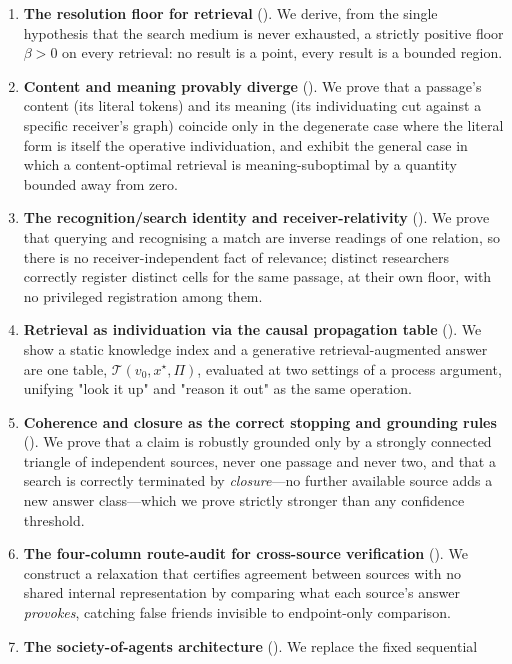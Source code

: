 \documentclass[11pt,twocolumn,a4paper]{article}
\theoremstyle{frathm}
\theoremstyle{definition}
\theoremstyle{remark}
\newcommand{\flo}{\beta}
\newcommand{\Tab}{\mathcal{T}}
\newcommand{\Proc}{\Pi}
\begin{document}
\begin{enumerate}[leftmargin=1.4em,itemsep=2pt]
\item \textbf{The resolution floor for retrieval} (). We
derive, from the single hypothesis that the search medium is never
exhausted, a strictly positive floor $\flo>0$ on every retrieval: no
result is a point, every result is a bounded region.
\item \textbf{Content and meaning provably diverge}
(). We prove that a passage's content (its
literal tokens) and its meaning (its individuating cut against a specific
receiver's graph) coincide only in the degenerate case where the literal
form is itself the operative individuation, and exhibit the general case
in which a content-optimal retrieval is meaning-suboptimal by a
quantity bounded away from zero.
\item \textbf{The recognition/search identity and receiver-relativity}
(). We prove that querying and recognising a
match are inverse readings of one relation, so there is no
receiver-independent fact of relevance; distinct researchers correctly
register distinct cells for the same passage, at their own floor, with
no privileged registration among them.
\item \textbf{Retrieval as individuation via the causal propagation
table} (). We show a static knowledge index and a
generative retrieval-augmented answer are one table,
$\Tab(v_0,x^{\star},\Proc)$, evaluated at two settings of a process
argument, unifying "look it up" and "reason it out" as the same
operation.
\item \textbf{Coherence and closure as the correct stopping and grounding
rules} (). We prove that a claim is robustly grounded
only by a strongly connected triangle of independent sources, never one
passage and never two, and that a search is correctly terminated by
\emph{closure}---no further available source adds a new answer class---which
we prove strictly stronger than any confidence threshold.
\item \textbf{The four-column route-audit for cross-source verification}
(). We construct a relaxation that certifies
agreement between sources with no shared internal representation by
comparing what each source's answer \emph{provokes}, catching false
friends invisible to endpoint-only comparison.
\item \textbf{The society-of-agents architecture}
(). We replace the fixed sequential

\end{enumerate}
\end{document}
